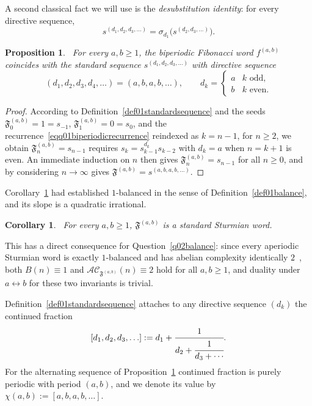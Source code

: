 \documentclass[12pt]{amsart}
\theoremstyle{plain}
\newtheorem{proposition}[theorem]{Proposition}
\newtheorem{corollary}[theorem]{Corollary}
\theoremstyle{definition}
\theoremstyle{remark}
\newcommand{\FD}{\mathfrak{F}}
\begin{document}
A second classical fact we will use is the \emph{desubstitution
identity}: for every directive sequence,
\begin{equation}  \label{eq01desubgeneral}
  s^{(d_1,d_2,d_3,\ldots)} = \sigma_{d_1}\bigl(s^{(d_2,d_3,\ldots)}\bigr).
\end{equation}

\begin{proposition}~\label{prop01fabisstandard}
For every $a,b\geqslant 1$, the biperiodic Fibonacci word $f^{(a,b)}$
coincides with the standard sequence $s^{(d_1,d_2,d_3,\ldots)}$ with
directive sequence
\[
  (d_1,d_2,d_3,d_4,\ldots) = (a,b,a,b,\ldots), \qquad
  d_k = \begin{cases} a & k \text{ odd},\\ b & k \text{ even}.\end{cases}
\]
\end{proposition}
\begin{proof}
According to Definition~\ref{def01standardsequence} and the seeds
$\FD^{(a,b)}_0=1=s_{-1}$, $\FD^{(a,b)}_1=0=s_0$, and the
recurrence~\eqref{eqq01biperiodicrecurrence} reindexed as $k=n-1$,  for
$n\geqslant 2$,  we obtain $\FD^{(a,b)}_n = s_{n-1}$ requires $s_k = s_{k-1}^{d_k}s_{k-2}$
with $d_k=a$ when $n=k+1$ is even. An immediate
induction on $n$ then gives $\FD^{(a,b)}_n=s_{n-1}$ for all $n\geqslant 0$, and
by considering  $n\to\infty$ gives $\FD^{(a,b)}=s^{(a,b,a,b,\ldots)}$.
\end{proof}

Corollary~\ref{cor01sturmian} had established $1$-balanced in the sense of
Definition~\ref{def01balance}, and its slope is a quadratic irrational.

\begin{corollary}~\label{cor01sturmian}
For every $a,b\geqslant 1$, $\FD^{(a,b)}$ is a standard Sturmian word.
\end{corollary}

This has a direct
consequence for Question~\ref{q02balance}: since every aperiodic
Sturmian word is exactly $1$-balanced and has abelian complexity
identically $2$~\cite{RichommeSaariZamboni2010}, both $B(n)\equiv1$ and
$\mathcal{AC}_{\FD^{(a,b)}}(n)\equiv2$ hold for all $a,b\geqslant 1$, and
duality under $a\leftrightarrow b$ for these two invariants is trivial.

Definition~\ref{def01standardsequence} attaches to any directive
sequence $(d_k)$ the continued fraction $$[d_1,d_2,d_3,\ldots] :=
d_1+\cfrac{1}{d_2+\cfrac{1}{d_3+\cdots}}.$$
For the alternating sequence
of Proposition~\ref{prop01fabisstandard} continued fraction is
purely periodic with period $(a,b)$, and we denote its value by $\chi(a,b) := [a,b,a,b,\ldots].$
\end{document}
